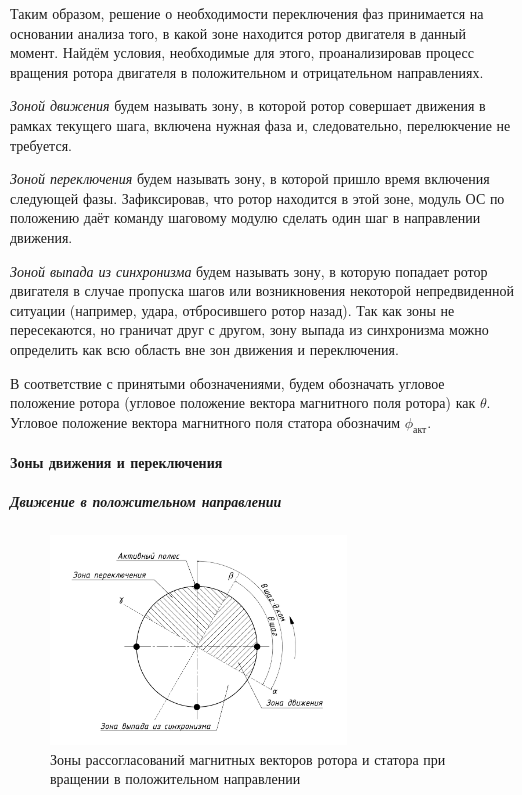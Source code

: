 Таким образом, решение о необходимости переключения фаз принимается на основании
анализа того, в какой зоне находится ротор двигателя в данный момент. Найдём условия,
необходимые для этого, проанализировав процесс вращения ротора двигателя в
положительном и отрицательном направлениях.

\textit{Зоной движения} будем называть зону, в которой ротор совершает движения в рамках
текущего шага, включена нужная фаза и, следовательно, перелюкчение не требуется.

\textit{Зоной переключения} будем называть зону, в которой пришло время включения
следующей фазы. Зафиксировав, что ротор находится в этой зоне, модуль ОС по положению
даёт команду шаговому модулю сделать один шаг в направлении движения.

\textit{Зоной выпада из синхронизма} будем называть зону, в которую попадает ротор
двигателя в случае пропуска шагов или возникновения некоторой непредвиденной ситуации
(например, удара, отбросившего ротор назад). Так как зоны не пересекаются, но граничат
друг с другом, зону выпада из синхронизма можно определить как всю область вне зон
движения и переключения.

В соответствие с принятыми обозначениями, будем обозначать угловое положение
ротора (угловое положение вектора магнитного поля ротора) как $\theta$.
Угловое положение вектора магнитного поля статора обозначим $\phi_\textit{акт}$.

\paragraph{Зоны движения и переключения}
\subparagraph{Движение в положительном направлении}
\begin{figure}
    \centering
    \includegraphics[width=0.7\textwidth, keepaspectratio]
                    {./src/pictures/feedback_control/pole_switch_zones_with_positive_dir}
    \caption{Зоны рассогласований магнитных векторов ротора и статора при вращении в положительном направлении}
    \label{pole_switch_zones_with_positive_dir}
\end{figure}

